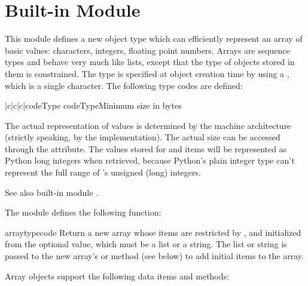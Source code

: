 \section{Built-in Module }
\label{module-array}

This module defines a new object type which can efficiently represent
an array of basic values: characters, integers, floating point
numbers.  Arrays are sequence types and behave very much like lists,
except that the type of objects stored in them is constrained.  The
type is specified at object creation time by using a ,
which is a single character.  The following type codes are defined:

\begin{tableiii}{|c|c|c|}{code}{Type code}{Type}{Minimum size in bytes}
\end{tableiii}

The actual representation of values is determined by the machine
architecture (strictly speaking, by the \C{} implementation).  The actual
size can be accessed through the  attribute.  The values
stored  for  and  items will be represented as
Python long integers when retrieved, because Python's plain integer
type can't represent the full range of \C{}'s unsigned (long) integers.

See also built-in module .

The module defines the following function:

\begin{funcdesc}{array}{typecode}
Return a new array whose items are restricted by , and
initialized from the optional  value, which must be a
list or a string.  The list or string is passed to the new array's
 or  method (see below) to add
initial items to the array.
\end{funcdesc}

Array objects support the following data items and methods:


